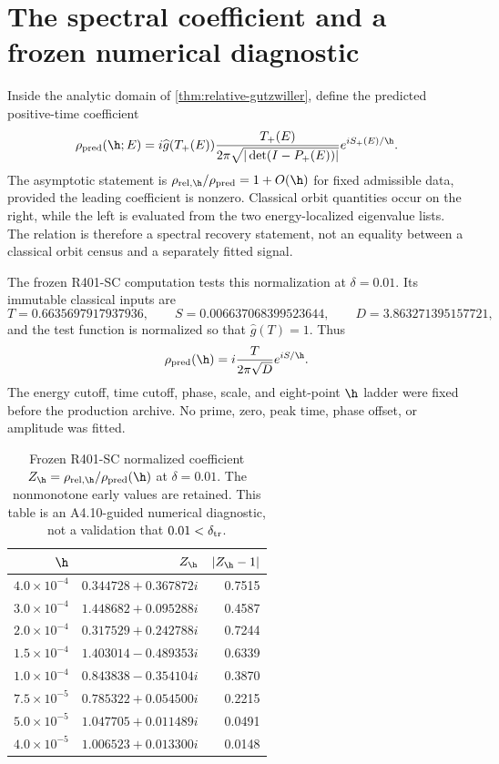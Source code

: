 \section{The spectral coefficient and a frozen numerical diagnostic}
\label{sec:spectral-diagnostic}

Inside the analytic domain of \cref{thm:relative-gutzwiller}, define the
predicted positive-time coefficient
\begin{equation}
 \rho_{\rm pred}(\h;E)
 =i\widehat g(T_+(E))
 \frac{T_+(E)}{2\pi\sqrt{|\det(I-P_+(E))|}}
 e^{iS_+(E)/\h}.
 \label{eq:rho-pred-general}
\end{equation}
The asymptotic statement is
\(\rho_{\mathrm{rel},\h}/\rho_{\rm pred}=1+O(\h)\) for fixed admissible
data, provided the leading coefficient is nonzero.  Classical orbit
quantities occur on the right, while the left is evaluated from the two
energy-localized eigenvalue lists.  The relation is therefore a spectral
recovery statement, not an equality between a classical orbit census and a
separately fitted signal.

The frozen R401-SC computation tests this normalization at
\(\delta=0.01\).  Its immutable classical inputs are
\begin{equation}
 T=0.6635697917937936,
 \qquad
 S=0.006637068399523644,
 \qquad
 D=3.863271395157721,
 \label{eq:r401-inputs}
\end{equation}
and the test function is normalized so that
\(\widehat g(T)=1\).  Thus
\begin{equation}
 \rho_{\rm pred}(\h)=i\frac{T}{2\pi\sqrt D}e^{iS/\h}.
 \label{eq:r401-oracle}
\end{equation}
The energy cutoff, time cutoff, phase, scale, and eight-point \(\h\) ladder
were fixed before the production archive.  No prime, zero, peak time, phase
offset, or amplitude was fitted.

\begin{table}[t]
\centering
\caption{Frozen R401-SC normalized coefficient
\(Z_\h=\rho_{\mathrm{rel},\h}/\rho_{\rm pred}(\h)\) at
\(\delta=0.01\).  The nonmonotone early values are retained.  This table is
an A4.10-guided numerical diagnostic, not a validation that
\(0.01<\delta_{\rm tr}\).}
\label{tab:r401-ladder}
\small
\begin{tabular}{@{}rrr@{}}
\toprule
\(\h\) & \(Z_\h\) & \(|Z_\h-1|\)\\
\midrule
\(4.0\times10^{-4}\) & \(0.344728+0.367872i\) & 0.7515\\
\(3.0\times10^{-4}\) & \(1.448682+0.095288i\) & 0.4587\\
\(2.0\times10^{-4}\) & \(0.317529+0.242788i\) & 0.7244\\
\(1.5\times10^{-4}\) & \(1.403014-0.489353i\) & 0.6339\\
\(1.0\times10^{-4}\) & \(0.843838-0.354104i\) & 0.3870\\
\(7.5\times10^{-5}\) & \(0.785322+0.054500i\) & 0.2215\\
\(5.0\times10^{-5}\) & \(1.047705+0.011489i\) & 0.0491\\
\(4.0\times10^{-5}\) & \(1.006523+0.013300i\) & 0.0148\\
\bottomrule
\end{tabular}
\end{table}

